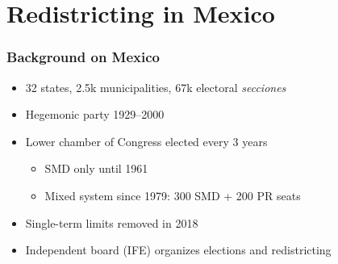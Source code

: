 \documentclass[xcolor=dvipsnames]{beamer}  %
\begin{document}
\section{Redistricting in Mexico}
\begin{frame}                      %

    \frametitle{Background on Mexico}

\begin{itemize}

\item 32 states, 2.5k municipalities, 67k electoral \emph{secciones}

\item Hegemonic party 1929--2000 

\item Lower chamber of Congress elected every 3 years

  \begin{itemize}

  \item SMD only until 1961
  \item Mixed system since 1979: 300 SMD + 200 PR seats

  \end{itemize}
  
\item Single-term limits removed in 2018

\item Independent board (IFE) organizes elections and redistricting

\end{itemize}

\end{frame}
\end{document}
